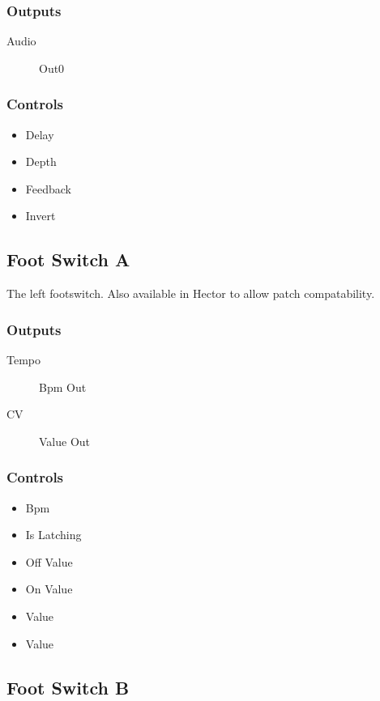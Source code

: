 \subsubsection{Outputs}
\begin{description}
\item [Audio] Out0
\end{description}

\subsubsection{Controls}
\begin{itemize}
\item Delay
\item Depth
\item Feedback
\item Invert
\end{itemize}

\subsection{Foot Switch A}

The left footswitch. Also available in Hector to allow patch compatability.



\subsubsection{Outputs}
\begin{description}
\item [Tempo] Bpm Out
\item [CV] Value Out
\end{description}

\subsubsection{Controls}
\begin{itemize}
\item Bpm
\item Is Latching
\item Off Value
\item On Value
\item Value
\item Value
\end{itemize}

\subsection{Foot Switch B}

